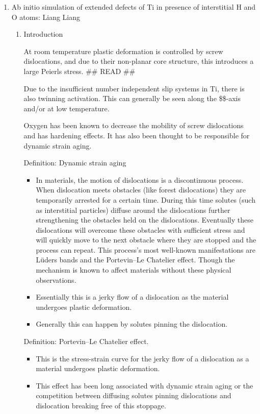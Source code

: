 \documentclass[11pt]{article}
\begin{document}
\begin{enumerate}
\item Ab initio simulation of extended defects of Ti in presence of interstitial H and O atoms: Liang Liang
\label{sec:org10e1824}
\cite{liang:tel-01355132}

\begin{enumerate}
\item Introduction
\label{sec:org435c0e4}

At room temperature plastic deformation is controlled by screw dislocations, and due to their 
non-planar core structure, this introduces a large Peierls stress. \cite{Biget1989} \#\# READ \#\#

Due to the insufficient number independent slip systems in Ti, there is also twinning activation. 
This can generally be seen along the \$\$-axis and/or at low temperature. 

Oxygen has been known to decrease the mobility of screw dislocations and has hardening effects. 
It has also been thought to be responsible for dynamic strain aging. 

Definition: Dynamic strain aging
\begin{itemize}
\item In materials, the motion of dislocations is a discontinuous process. When dislocation meets obstacles 
(like forest dislocations) they are temporarily arrested for a certain time. During this time solutes 
(such as interstitial particles) diffuse around the dislocations further strengthening the obstacles
 held on the dislocations. Eventually these dislocations will overcome these obstacles with sufficient 
stress and will quickly move to the next obstacle where they are stopped and the process can repeat. 
This process's most well-known manifestations are Lüders bands and the Portevin–Le Chatelier effect. 
Though the mechanism is known to affect materials without these physical observations.
\item Essentially this is a jerky flow of a dislocation as the material undergoes plastic deformation.
\item Generally this can happen by solutes pinning the dislocation.
\end{itemize}

Definition: Portevin–Le Chatelier effect. 
\begin{itemize}
\item This is the stress-strain curve for the jerky flow of a dislocation as a material undergoes plastic deformation.
\item This effect has been long associated with dynamic strain aging or the competition between diffusing solutes
pinning dislocations and dislocation breaking free of this stoppage.
\end{itemize}


\end{enumerate}
\end{enumerate}
\end{document}
